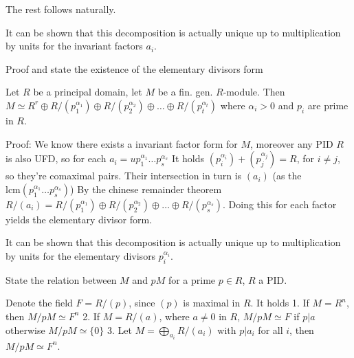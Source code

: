 The rest follows naturally.

It can be shown that this decomposition is actually unique up to multiplication by units for the invariant factors \(a_i\).

Proof and state the existence of the elementary divisors form

Let \(R\) be a principal domain, let \(M\) be a fin. gen. \(R\)-module.
Then \(M \simeq R^{r} \oplus R/(p^{\alpha_1}_1) \oplus R/(p^{\alpha_2}_2) \oplus \dots \oplus R/(p^{\alpha_t}_t)\)
where \(\alpha_i > 0\) and \(p_i\) are prime in \(R\).

Proof:
We know there exists a invariant factor form for \(M\), moreover any PID \(R\) is also UFD, so for each \(a_i = u p_1^{\alpha_1}\dots p_s^{\alpha_s}\)
It holds \((p_i^{\alpha_i}) + (p_j^{\alpha_j}) = R\), for \(i \neq j\), so they're comaximal pairs. Their intersection in turn is \((a_i)\) (as the \(\text{lcm}(p_1^{\alpha_1}\dots p_s^{\alpha_s})\))
By the chinese remainder theorem \(R/(a_i) = R/(p_1^{\alpha_1}) \oplus R/(p_2^{\alpha_2}) \oplus \dots \oplus R/(p_s^{\alpha_s})\). Doing this for each factor yields the elementary divisor form.


It can be shown that this decomposition is actually unique up to multiplication by units for the elementary divisors \(p_i^{\alpha_i}\).


State the relation between \(M\) and \(pM\) for a prime \(p \in R\), \(R\) a PID.

Denote the field \(F = R/(p)\), since \((p)\) is maximal in \(R\).
It holds
1. If \(M = R^n\), then \(M/pM \simeq F^n\)
2. If \(M = R/(a)\), where \(a \neq 0\) in \(R\), \(M/pM \simeq F\) if \(p | a\) otherwise \(M/pM \simeq \{0\}\)
3. Let \(M = \bigoplus_{a_i} R/(a_i)\) with \(p | a_i\) for all \(i\), then \(M/pM \simeq F^n\).
